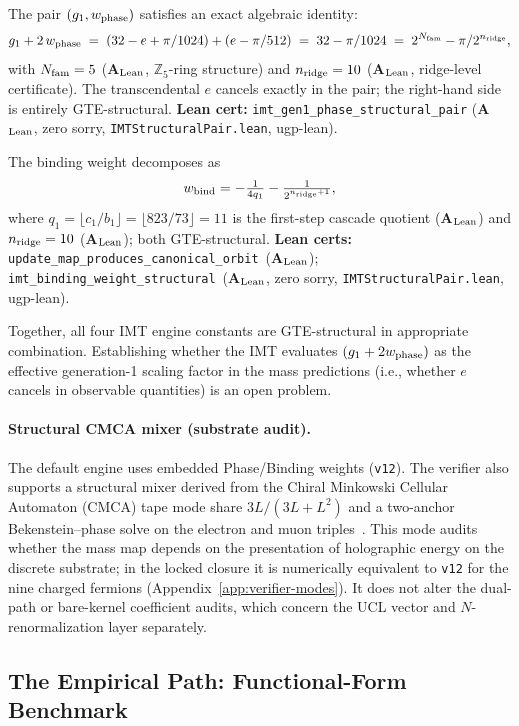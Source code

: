 \documentclass[11pt]{article}
\theoremstyle{remark}
\newcommand{\CatAL}{\textbf{A}$_{\rm Lean}$}
\begin{document}
The pair $(g_1, w_{\rm phase})$ satisfies an exact algebraic identity:
\[
  g_1 + 2\,w_{\rm phase}
  \;=\; (32 - e + \pi/1024) + (e - \pi/512)
  \;=\; 32 - \pi/1024
  \;=\; 2^{N_{\rm fam}} - \pi/2^{n_{\rm ridge}},
\]
with $N_{\rm fam} = 5$ (\CatAL, $\mathbb{Z}_5$-ring structure) and $n_{\rm ridge} = 10$
(\CatAL, ridge-level certificate).  The transcendental $e$ cancels exactly in the pair;
the right-hand side is entirely GTE-structural.
\textbf{Lean cert:} \texttt{imt\_gen1\_phase\_structural\_pair}
(\CatAL, zero sorry, \texttt{IMTStructuralPair.lean}, ugp-lean).

The binding weight decomposes as
\[
  w_{\rm bind} = -\tfrac{1}{4q_1} - \tfrac{1}{2^{n_{\rm ridge}+1}},
\]
where $q_1 = \lfloor c_1/b_1\rfloor = \lfloor 823/73\rfloor = 11$ is the first-step
cascade quotient (\CatAL) and $n_{\rm ridge} = 10$ (\CatAL); both GTE-structural.
\textbf{Lean certs:}\linebreak
\texttt{update\_map\_produces\_canonical\_orbit}~(\CatAL);
\texttt{imt\_binding\_weight\_structural}~(\CatAL, zero sorry,
\texttt{IMTStructuralPair.lean}, ugp-lean).

Together, all four IMT engine constants are GTE-structural in appropriate combination.
Establishing whether the IMT evaluates $(g_1 + 2w_{\rm phase})$ as the effective
generation-1 scaling factor in the mass predictions (i.e., whether $e$ cancels in
observable quantities) is an open problem.

\paragraph{Structural CMCA mixer (substrate audit).}
The default engine uses embedded Phase/Binding weights (\texttt{v12}).
The verifier also supports a structural mixer derived from the Chiral Minkowski Cellular Automaton (CMCA) tape
mode share $3L/(3L+L^2)$ and a two-anchor Bekenstein--phase solve on the
electron and muon triples~\cite{SpivackCMCA,SpivackThreeTapeCMCA}.
This mode audits whether the mass map depends on the presentation of
holographic energy on the discrete substrate; in the locked closure it is
numerically equivalent to \texttt{v12} for the nine charged fermions
(Appendix~\ref{app:verifier-modes}).
It does not alter the dual-path or bare-kernel coefficient audits, which
concern the UCL vector and $N$-renormalization layer separately.


\subsection{The Empirical Path: Functional-Form Benchmark}
\label{subsec:empirical}
\end{document}

